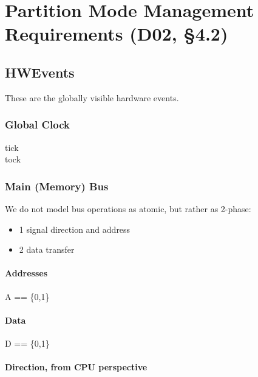 \chapter{Partition Mode Management Requirements (D02, \S4.2)}


\section{HWEvents}

These are the globally visible hardware events.

\subsection{Global Clock}

\begin{circus}
\circchannel tick\\  %
\circchannel tock  %
\end{circus}

\subsection{Main (Memory) Bus}

  We do not model bus operations as atomic, but rather as 2-phase:
	\begin{itemize}
   \item{1} signal direction and address
   \item{2} data transfer
	 \end{itemize}

\subsubsection{Addresses}

\begin{circus}
A == \{0,1\}
\end{circus}

\subsubsection{Data}

\begin{circus}
D == \{0,1\}
\end{circus}

\subsubsection{Direction, from CPU perspective}


